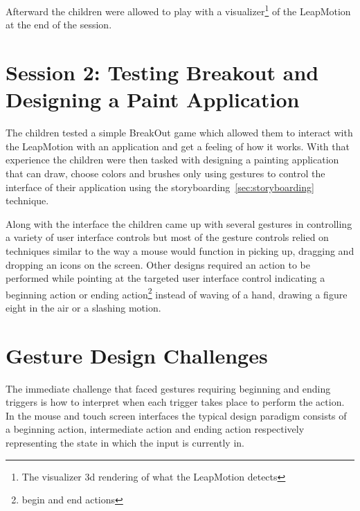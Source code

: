 Afterward the children were allowed to play with a visualizer\footnote{The visualizer 3d rendering of what the LeapMotion detects} of the LeapMotion at the end of the session. 




\section{Session 2: Testing Breakout and Designing a Paint Application}\label{session2}
The children tested a simple BreakOut game which allowed them to interact with the LeapMotion with an application and get a feeling of how it works. With that experience the children were then tasked with designing a painting application that can draw, choose colors and brushes only using gestures to control the interface of their application using the storyboarding~\ref{sec:storyboarding} technique. 

Along with the interface the children came up with several gestures in controlling a variety of user interface controls but most of the gesture controls relied on techniques similar to the way a mouse would function in picking up, dragging and dropping an icons on the screen. Other designs required an action to be performed while pointing at the targeted user interface control indicating a beginning action or ending action\footnote{begin and end actions} instead of waving of a hand, drawing a figure eight in the air or a slashing motion. 

\section{Gesture Design Challenges}
The immediate challenge that faced gestures requiring beginning and ending triggers is how to interpret when each trigger takes place to perform the action. In the mouse and touch screen interfaces the typical design paradigm consists of a beginning action, intermediate action and ending action respectively representing the state in which the input is currently in.

